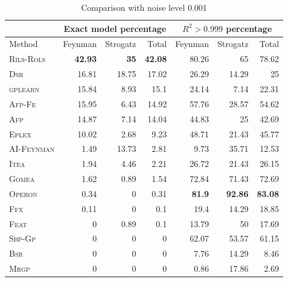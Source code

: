\documentclass[a4paper,12pt]{elsarticle}
\begin{document}
\begin{table}[!htb]
	\caption{Comparison with noise level 0.001}\label{tab:comp_noise0001}
	\centering
	\begin{tabular}{l|rrr|rrr} \hline
		& \multicolumn{3}{c|}{Exact model percentage} & \multicolumn{3}{c}{$R^2 > 0.999$ percentage}\\ \hline
		Method & Feynman & Strogatz & Total & Feynman & Strogatz & Total \\ \hline
		\textsc{Rils-Rols}&\bf{42.93}&\bf{35}&\bf{42.08}&80.26&65&78.62\\
		\textsc{Dsr}&16.81&18.75&17.02&26.29&14.29&25\\
		\textsc{gplearn}&15.84&8.93&15.1&24.14&7.14&22.31\\
		\textsc{Afp-Fe}&15.95&6.43&14.92&57.76&28.57&54.62\\
		\textsc{Afp}&14.87&7.14&14.04&44.83&25&42.69\\
		\textsc{Eplex} &10.02&2.68&9.23&48.71&21.43&45.77\\
		\textsc{AI-Feynman}&1.49&13.73&2.81&9.73&35.71&12.53\\
		\textsc{Itea}&1.94&4.46&2.21&26.72&21.43&26.15\\
		\textsc{Gomea}&1.62&0.89&1.54&72.84&71.43&72.69\\
		\textsc{Operon}&0.34&0&0.31&\bf{81.9}&\bf{92.86}&\bf{83.08}\\
		\textsc{Ffx}&0.11&0&0.1&19.4&14.29&18.85\\
		\textsc{Feat}&0&0.89&0.1&13.79&50&17.69\\
		\textsc{Sbp-Gp}&0&0&0&62.07&53.57&61.15\\
		\textsc{Bsr}&0&0&0&7.76&14.29&8.46\\
		\textsc{Mrgp}&0&0&0&0.86&17.86&2.69\\
		\hline
	\end{tabular}
\end{table}
\end{document}

